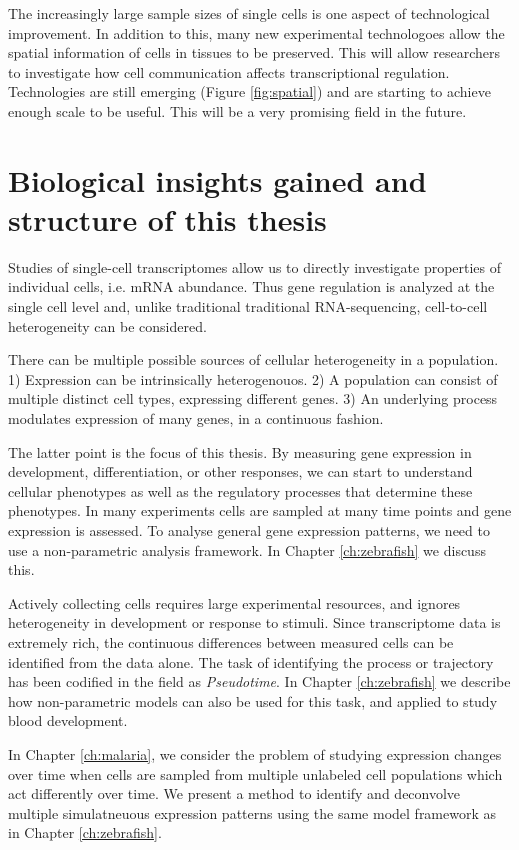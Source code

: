 The increasingly large sample sizes of single cells is one aspect of technological improvement. In addition to this, many new experimental technologoes allow the spatial information of cells in tissues to be preserved. This will allow researchers to investigate how cell communication affects transcriptional regulation. Technologies are still emerging (Figure \ref{fig:spatial}) and are starting to achieve enough scale to be useful. This will be a very promising field in the future.

\section{Biological insights gained and structure of this thesis}

Studies of single-cell transcriptomes allow us to directly investigate properties of individual cells, i.e. mRNA abundance. Thus gene regulation is analyzed at the single cell level and, unlike traditional traditional RNA-sequencing, cell-to-cell heterogeneity can be considered.

There can be multiple possible sources of cellular heterogeneity in a population. 1) Expression can be intrinsically heterogenouos. 2) A population can consist of multiple distinct cell types, expressing different genes. 3) An underlying process modulates expression of many genes, in a continuous fashion.

The latter point is the focus of this thesis. By measuring gene expression in development, differentiation, or other responses, we can start to understand cellular phenotypes as well as the regulatory processes that determine these phenotypes. In many experiments cells are sampled at many time points and gene expression is assessed. To analyse general gene expression patterns, we need to use a non-parametric analysis framework. In Chapter \ref{ch:zebrafish} we discuss this.

Actively collecting cells requires large experimental resources, and ignores heterogeneity in development or response to stimuli. Since transcriptome data is extremely rich, the continuous differences between measured cells can be identified from the data alone. The task of identifying the process or trajectory has been codified in the field as \textit{Pseudotime}. In Chapter \ref{ch:zebrafish} we describe how non-parametric models can also be used for this task, and applied to study blood development.

In Chapter \ref{ch:malaria}, we consider the problem of studying expression changes over time when cells are sampled from multiple unlabeled cell populations which act differently over time. We present a method to identify and deconvolve multiple simulatneuous expression patterns using the same model framework as in Chapter \ref{ch:zebrafish}.

